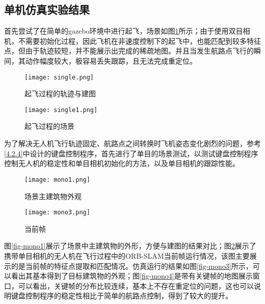 \subsection{单机仿真实验结果} \label{4.2.5}

首先尝试了在简单的gazebo环境中进行起飞，场景如图\ref{fig4-6-1}所示；由于使用双目相机，不需要初始化过程，因此飞机在非速度控制下的起飞中，也能匹配到较多特征点，但由于轨迹较短，并不能展示出完成的稀疏地图。并且当发生航路点飞行的瞬间，其动作幅度较大，极容易丢失跟踪，且无法完成重定位。
~\\
\begin{figure}[htbp]
	\centering
	\begin{minipage}[t]{0.45\columnwidth} %
		\centering
		\texttt{[image: single.png]}
		\caption{起飞过程的轨迹与建图}
		\label{fig4-6}
	\end{minipage}
	\begin{minipage}[t]{0.45\columnwidth}
		\centering
		\texttt{[image: single1.png]}
		\caption{起飞过程的场景}
		\label{fig4-6-1}
	\end{minipage}
\end{figure}

为了解决无人机飞行轨迹固定、航路点之间转换时飞机姿态变化剧烈的问题，参考\ref{4.2.4}中设计的键盘控制程序，首先进行了单目的场景测试，以测试键盘控制程序控制无人机的稳定性和单目相机初始化的方法，以及单目相机的跟踪性能。
~\\
\begin{figure}[htbp]
	\centering
	\begin{minipage}[t]{0.45\columnwidth} %
		\centering
		\texttt{[image: mono1.png]}
		\caption{场景主建筑物外观}
		\label{fig-mono1}
	\end{minipage}
	\begin{minipage}[t]{0.45\columnwidth}
		\centering
		\texttt{[image: mono3.png]}
		\caption{当前帧}
		\label{fig-mono2}
	\end{minipage}
\end{figure}

图\ref{fig-mono1}展示了场景中主建筑物的外形，方便与建图的结果对比；图\ref{fig-mono2}展示了携带单目相机的无人机在飞行过程中的ORB-SLAM当前帧运行情况，该图主要展示的是当前帧的特征点提取和匹配情况。仿真运行的结果如图\ref{fig-mono3}所示，可以看出其基本得到了目标建筑物的外观；图\ref{fig-mono4}是带有关键帧的地图展示窗口，可以看出，关键帧的分布比较连续，基本上不存在重定位的问题，这也可以说明键盘控制程序的稳定性相比于简单的航路点控制，得到了较大的提升。

